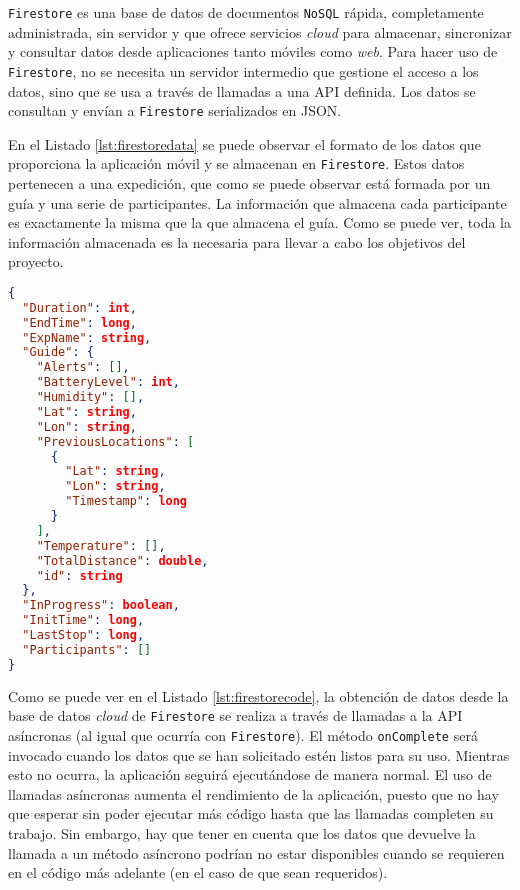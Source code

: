 \texttt{Firestore} es una base de datos de documentos \texttt{NoSQL} rápida, completamente administrada, sin servidor y que ofrece servicios \textit{cloud} para almacenar, sincronizar y consultar datos desde aplicaciones tanto móviles como \textit{web}. Para hacer uso de \texttt{Firestore}, no se necesita un servidor intermedio que gestione el acceso a los datos, sino que se usa a través de llamadas a una \ac{API} definida. Los datos se consultan y envían a \texttt{Firestore} serializados en \ac{JSON}. 

En el Listado \ref{lst:firestoredata} se puede observar el formato de los datos que proporciona la aplicación móvil y se almacenan en \texttt{Firestore}. Estos datos pertenecen a una expedición, que como se puede observar está formada por un guía y una serie de participantes. La información que almacena cada participante es exactamente la misma que la que almacena el guía. Como se puede ver, toda la información almacenada es la necesaria para llevar a cabo los objetivos del proyecto.

\begin{lstlisting}[language=json,captionpos=t,caption={\textbf{Formato de los datos almacenados en \texttt{Firestore} para una expedición.}},label={lst:firestoredata}]
{
  "Duration": int,
  "EndTime": long,
  "ExpName": string,
  "Guide": {
    "Alerts": [],
    "BatteryLevel": int,
    "Humidity": [],
    "Lat": string,
    "Lon": string,
    "PreviousLocations": [
      {
        "Lat": string,
        "Lon": string,
        "Timestamp": long
      }
    ],
    "Temperature": [],
    "TotalDistance": double,
    "id": string
  },
  "InProgress": boolean,
  "InitTime": long,
  "LastStop": long,
  "Participants": []
}
\end{lstlisting}

Como se puede ver en el Listado \ref{lst:firestorecode}, la obtención de datos desde la base de datos \textit{cloud} de \texttt{Firestore} se realiza a través de llamadas a la \ac{API} asíncronas (al igual que ocurría con \texttt{Firestore}). El método \texttt{onComplete} será invocado cuando los datos que se han solicitado estén listos para su uso. Mientras esto no ocurra, la aplicación seguirá ejecutándose de manera normal. El uso de llamadas asíncronas aumenta el rendimiento de la aplicación, puesto que no hay que esperar sin poder ejecutar más código hasta que las llamadas completen su trabajo. Sin embargo, hay que tener en cuenta que los datos que devuelve la llamada a un método asíncrono podrían no estar disponibles cuando se requieren en el código más adelante (en el caso de que sean requeridos).

